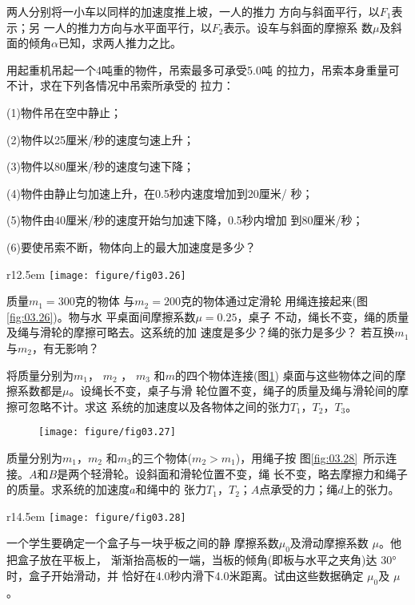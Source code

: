 \documentclass[../outline-of-mechanics.tex]{subfiles}
\begin{document}
\begin{exercises}
\exercise 两人分别将一小车以同样的加速度推上坡，一人的推力
方向与斜面平行，以$ F_1 $表示；另
一人的推力方向与水平面平行，以$ F_2 $表示。设车与斜面的摩擦系
数$ \mu $及斜面的倾角$ \alpha $已知，求两人推力之比。

\exercise 用起重机吊起一个4吨重的物件，吊索最多可承受5.0吨
的拉力，吊索本身重量可不计，求在下列各情况中吊索所承受的
拉力：

(1)物件吊在空中静止；

(2)物件以25厘米/秒的速度匀速上升；

(3)物件以80厘米/秒的速度匀速下降；

(4)物件由静止匀加速上升，在0.5秒内速度增加到20厘米/
秒；

(5)物件由40厘米/秒的速度开始匀加速下降，0.5秒内增加
到80厘米/秒；

(6)要使吊索不断，物体向上的最大加速度是多少？

\begin{wrapfigure}[8]{r}{12.5em}
  \centering
  \texttt{[image: figure/fig03.26]}
  \caption{}
  \label{fig:03.26}
\end{wrapfigure}
\exercise 质量$ m _ { 1 } = 3 0 0 $克的物体
与$ m _ { 2 } = 2 0 0 $克的物体通过定滑轮
用绳连接起来(图\ref{fig:03.26})。物与水
平桌面间摩擦系数$ \mu = 0 . 2 5 $，桌子
不动，绳长不变，绳的质量及绳与滑轮的摩擦可略去。这系统的加
速度是多少？绳的张力是多少？
若互换$ m_1 $与$ m_2 $，有无影响？

\exercise 将质量分别为$ m_1 $， $ m _ { 2 } $ ， $m _ { 3 }$ 和$ m $的四个物体连接(图\ref{fig:03.27})
桌面与这些物体之间的摩擦系数都是$ \mu $。设绳长不变，桌子与滑
轮位置不变，绳子的质量及绳与滑轮间的摩擦可忽略不计。求这
系统的加速度以及各物体之间的张力$ T _ { 1 } $，$ T _ { 2 } $，$ T _ { 3 } $。
\begin{figure}[h]
  \centering
  \texttt{[image: figure/fig03.27]}
  \caption{}
  \label{fig:03.27}
\end{figure}

\exercise 质量分别为$ m_1 $，$ m _ { 2 } $ 和$ m_3 $的三个物体($ m _ { 2 } > m _ { 1 } $)，用绳子按
图\ref{fig:03.28}~所示连接。$ A $和$ B $是两个轻滑轮。设斜面和滑轮位置不变，绳
长不变，略去摩擦力和绳子的质量。求系统的加速度$ a $和绳中的
张力$ T _ { 1 } $，$ T _ { 2 } $；$ A $点承受的力；绳$ d $上的张力。

\begin{wrapfigure}[7]{r}{14.5em}
  \centering
  \texttt{[image: figure/fig03.28]}
  \caption{}
  \label{fig:03.28}
\end{wrapfigure}
\exercise 一个学生要确定一个盒子与一块乎板之间的静
摩擦系数$ \mu _ 0 $及滑动摩擦系数 $\mu$。他把盒子放在平板上，
渐渐抬高板的一端，当板的倾角(即板与水平之夹角)达
\ang{30}时，盒子开始滑动，并
恰好在4.0秒内滑下4.0米距离。试由这些数据确定 $\mu_0$及 $\mu$。


\end{exercises}
\end{document}
